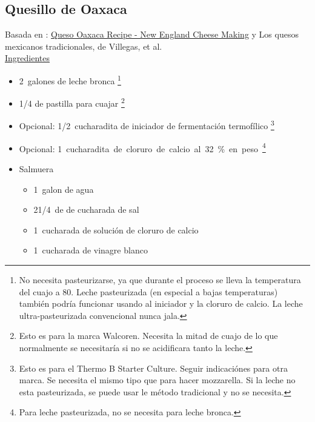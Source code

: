 \subsection{Quesillo de Oaxaca}

Basada en : \href{https://cheesemaking.com/products/queso-oaxaca-recipe}{Queso Oaxaca Recipe - New England Cheese Making} y Los quesos mexicanos tradicionales, de Villegas, et al. \\

\underline{Ingredientes}
\begin{itemize}
\item \SI{2}{galones} de leche bronca \footnote{No necesita pasteurizarse, ya que durante el proceso se lleva la temperatura del cuajo a 80. Leche pasteurizada (en especial a bajas temperaturas) también podría funcionar usando al iniciador y la cloruro de calcio. La leche ultra-pasteurizada convencional nunca jala.}
\item \num{1/4} de pastilla para cuajar \footnote{Esto es para la marca Walcoren. Necesita la mitad de cuajo de lo que normalmente se necesitaría si no se acidificara tanto la leche.} 
\item Opcional: \SI{1/2}{cucharadita} de iniciador de fermentación termofílico \footnote{Esto es para el Thermo B Starter Culture. Seguir indicaciónes para otra marca. Se necesita el mismo tipo que para hacer mozzarella. Si la leche no esta pasteurizada, se puede usar le método tradicional y no se necesita.}
\item Opcional: \SI{1} cucharadita de cloruro de calcio al 32\% en peso \footnote{Para leche pasteurizada, no se necesita para leche bronca.}
\item Salmuera
\begin{itemize}
\item \SI{1}{galon} de agua
\item 2\SI{1/4}{de} de cucharada de sal
\item \SI{1}{cucharada} de solución de cloruro de calcio
\item \SI{1}{cucharada} de vinagre blanco
\end{itemize}
\end{itemize}


